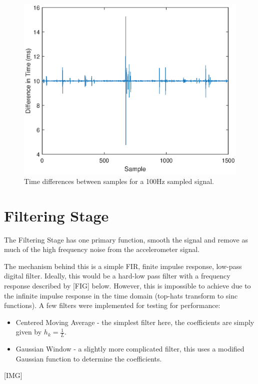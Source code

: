             \begin{figure}[h]
                \includegraphics[width=\textwidth]{Images/sampling_freq.eps}
                \centering
                \caption{Time differences between samples for a 100Hz sampled signal.}
                \label{img_sampling_freq}
            \end{figure}

        \section{Filtering Stage}

            The Filtering Stage has one primary function, smooth the signal and remove as much of the high frequency noise from the accelerometer signal.

            The mechanism behind this is a simple FIR, finite impulse response, low-pass digital filter. Ideally, this would be a hard-low pass filter with a frequency response described by [FIG] below. However, this is impossible to achieve due to the infinite impulse response in the time domain (top-hats transform to sinc functions). A few filters were implemented for testing for performance:

            \begin{itemize}
                \item Centered Moving Average - the simplest filter here, the coefficients are simply given by $h_k = \frac{1}{L}$.
                \item Gaussian Window - a slightly more complicated filter, this uses a modified Gaussian function to determine the coefficients.
            \end{itemize}
            [IMG]

